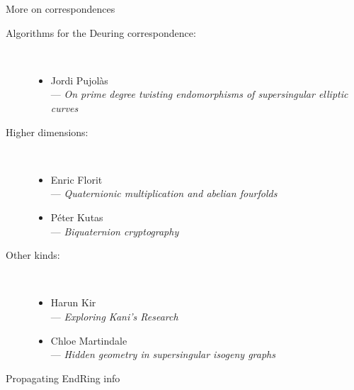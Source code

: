 \documentclass[aspectratio=169]{beamer}
\begin{document}

\begin{frame}{More on correspondences}
  \begin{description}
  \item[Algorithms for the Deuring correspondence:]\
    \begin{itemize}
    \item Jordi Pujolàs\\
      --- \textit{On prime degree twisting endomorphisms of
        supersingular elliptic curves}
    \end{itemize}
  \item[Higher dimensions:]\ 
    \begin{itemize}
    \item Enric Florit\\
      --- \textit{Quaternionic multiplication and abelian fourfolds}
    \item Péter Kutas\\
      --- \textit{Biquaternion cryptography}
    \end{itemize}
  \item[Other kinds:]\
    \begin{itemize}
    \item Harun Kir\\
      --- \textit{Exploring Kani's Research}
    \item Chloe Martindale\\
      --- \textit{Hidden geometry in supersingular isogeny graphs}
    \end{itemize}
  \end{description}
\end{frame}


\begin{frame}{Propagating EndRing info}
  \centering
\end{frame}
\end{document}
